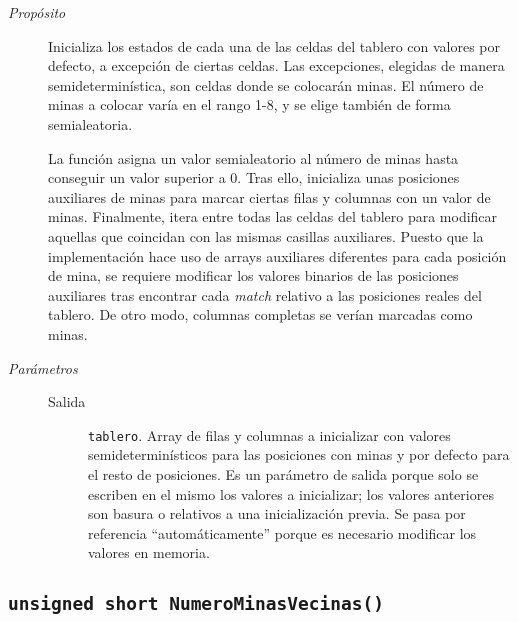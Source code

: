 \documentclass[12pt]{article}
\begin{document}
\begin{description}

\item[\emph{Propósito}]

Inicializa los estados de cada una de las celdas del tablero con valores por
defecto, a excepción de ciertas celdas. Las excepciones, elegidas de manera
semideterminística, son celdas donde se colocarán minas. El número de minas a
colocar varía en el rango 1-8, y se elige también de forma semialeatoria.

La función asigna un valor semialeatorio al número de minas hasta conseguir un
valor superior a 0. Tras ello, inicializa unas posiciones auxiliares de minas
para marcar ciertas filas y columnas con un valor de minas. Finalmente, itera
entre todas las celdas del tablero para modificar aquellas que coincidan con las
mismas casillas auxiliares. Puesto que la implementación hace uso de arrays
auxiliares diferentes para cada posición de mina, se requiere modificar los
valores binarios de las posiciones auxiliares tras encontrar cada \emph{match}
relativo a las posiciones reales del tablero. De otro modo, columnas completas
se verían marcadas como minas.

\item[\emph{Parámetros}] \leavevmode

\begin{description}

\item[Salida] \texttt{tablero}. Array de filas y columnas a inicializar
con valores semideterminísticos para las posiciones con minas y por defecto para
el resto de posiciones. Es un parámetro de salida porque solo se escriben en el
mismo los valores a inicializar; los valores anteriores son basura o relativos a
una inicialización previa. Se pasa por referencia ``automáticamente'' porque es
necesario modificar los valores en memoria.

\end{description}

\end{description}

\subsection*{\texttt{unsigned short NumeroMinasVecinas()}}
\end{document}
